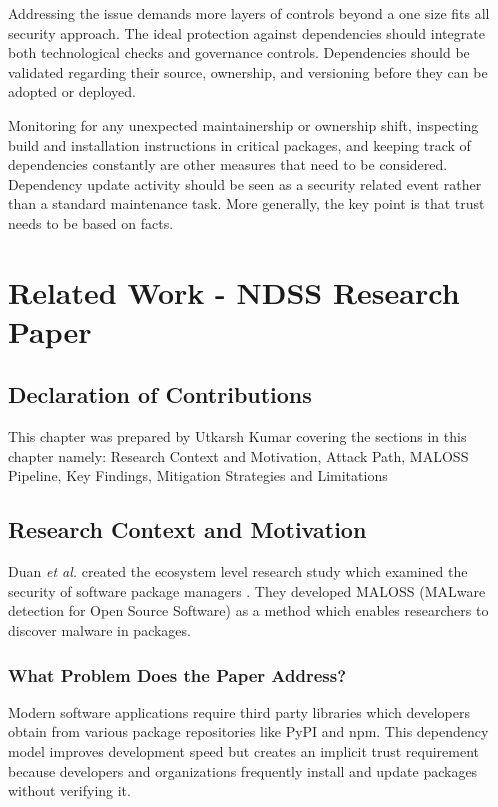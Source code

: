 Addressing the issue demands more layers of controls beyond a one size fits all security approach. The ideal protection against dependencies should integrate both technological checks and governance controls. Dependencies should be validated regarding their source, ownership, and versioning before they can be adopted or deployed.

Monitoring for any unexpected maintainership or ownership shift, inspecting build and installation instructions in critical packages, and keeping track of dependencies constantly are other measures that need to be considered. Dependency update activity should be seen as a security related event rather than a standard maintenance task. More generally, the key point is that trust needs to be based on facts.

\chapter{Related Work - NDSS Research Paper}
\label{ch:related-ndss}

\section*{Declaration of Contributions}
This chapter was prepared by Utkarsh Kumar covering the sections in this chapter namely: Research Context and Motivation, Attack Path, MALOSS Pipeline, Key Findings, Mitigation Strategies and Limitations

\section{Research Context and Motivation}

Duan \textit{et al.} created the ecosystem level research study which examined the security of software package managers \citep{duan2021ndss}. They developed MALOSS (MALware detection for Open Source Software) as a method which enables researchers to discover malware in packages.

\subsection{What Problem Does the Paper Address?}

Modern software applications require third party libraries which developers obtain from various package repositories like PyPI and npm. This dependency model improves development speed but creates an implicit trust requirement because developers and organizations frequently install and update packages without verifying it.

